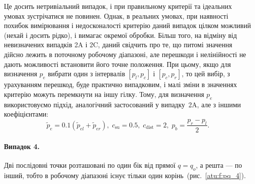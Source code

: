 Це досить нетривіальний випадок, і при правильному критерії
та ідеальних умовах зустрічатися не повинен. Однак, в реальних
умовах, при наявності похибок вимірювання і недосконалості критерію
даний випадок цілком можливий (нехай і досить рідко), і вимагає
окремої обробки. Більш того, на відміну від невизначених
випадків 2A і 2C, даний свідчить про те, що питомі значення дійсно
лежить в поточному робочому діапазоні, але перешкоди і
нелінійності не дають можливості встановити його точне
положення. При цьому, якщо для визначення
$ p_e $ вибрати один з інтервалів
$ [p_l, p_c] $ і
$ [p_c, p_r] $, то цей вибір, з урахуванням перешкод, буде практично
випадковим, і малі зміни в значеннях критерію можуть перемкнути
на іншу гілку. Тому, для визначення
$ p_e $ використовуємо підхід, аналогічний застосований у випадку~2A,
але з іншими коефіцієнтами:
%
\begin{equation}
  \tilde{p}_e = 0.1 ( \tilde{p}_{el} + \tilde{p}_{er} ),
  \;
  c_\mathrm{su} = 0.5, \;  c_\mathrm{dist} = 2, \;   p_b = \frac{p_r - p_l}{2}.
  \label{atu:eq:pr_e_3}
\end{equation}


\paragraph{Випадок 4.}
%
Дві послідовні точки
розташовані по один бік
від прямої
$q = q_o$, а решта --- по інший, тобто в робочому діапазоні існує тільки один
корінь~(рис.~\ref{atu:f:pq_4}).


